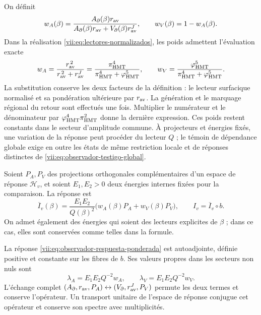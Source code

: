 On définit
\[
 w_A(\beta)=
 \frac{A_\partial(\beta)r_{\rm av}}
 {A_\partial(\beta)r_{\rm av}+V_\partial(\beta)r_{\rm av}^{J}},
 \qquad w_V(\beta)=1-w_A(\beta).
\]
Dans la réalisation \eqref{vii:eq:lectores-normalizados}, les poids
admettent l'évaluation exacte
\begin{equation}
 w_A=\frac{r_{\rm av}^{\,2}}{r_{\rm av}^{\,2}+r_{\rm av}^{J}}
     =\frac{\pi_{\rm HMT}^{4}}
            {\pi_{\rm HMT}^{4}+\varphi_{\rm HMT}^{5}},\qquad
 w_V=\frac{\varphi_{\rm HMT}^{5}}
            {\pi_{\rm HMT}^{4}+\varphi_{\rm HMT}^{5}}.
 \label{vii:eq:pesos-amplitud-comun}
\end{equation}
La substitution conserve les deux facteurs de la définition : le lecteur
surfacique normalisé et sa pondération ultérieure par \(r_{\rm av}\).
La génération et le marquage régional du retour sont effectués une fois.
Multiplier le numérateur
et le dénominateur par \(\varphi_{\rm HMT}^4\pi_{\rm HMT}^2\)
donne la dernière expression. Ces poids restent constants dans le
secteur d'amplitude commune. À projecteurs et énergies fixés, une
variation de la réponse peut procéder du lecteur \(Q\) ;
le témoin de dépendance globale exige en outre les états de
même restriction locale et de réponses distinctes de
\eqref{vii:eq:observador-testigo-global}.


Soient \(P_A,P_V\) des projections orthogonales complémentaires d'un
espace de réponse \(\mathcal H_v\), et soient \(E_1,E_2>0\)
deux énergies internes fixées pour la comparaison. La réponse est
\begin{equation}
 \overline I_v(\beta)=\frac{E_1E_2}{Q(\beta)^2}
       \bigl(w_A(\beta)P_A+w_V(\beta)P_V\bigr),
 \qquad I_v=\overline I_v\circ b.
 \label{vii:eq:observador-respuesta-ponderada}
\end{equation}
On admet également des énergies qui soient des lecteurs explicites de
\(\beta\) ; dans ce cas, elles sont conservées comme telles dans la formule.

\begin{proposition}
\label{vii:prop:observador-respuesta-positiva}
La réponse \eqref{vii:eq:observador-respuesta-ponderada} est
autoadjointe, définie positive et constante sur les fibres de \(b\).
Ses valeurs propres dans les secteurs non nuls sont
\[
 \lambda_A=E_1E_2Q^{-2}w_A,\qquad
 \lambda_V=E_1E_2Q^{-2}w_V.
\]
L'échange complet \((A_\partial,r_{\rm av},P_A)
 \leftrightarrow(V_\partial,r_{\rm av}^{J},P_V)\) permute les deux termes et conserve l'opérateur. Un transport unitaire de l'espace de réponse conjugue cet opérateur et conserve son spectre avec multiplicités.
\end{proposition}


